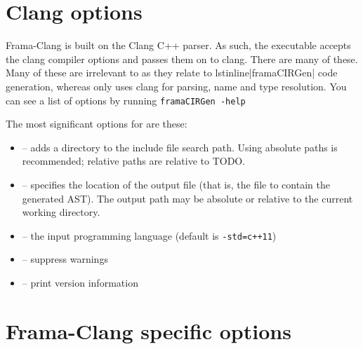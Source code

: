 \section{Clang options}

Frama-Clang is built on the Clang C++ parser. 
As such, the \irg executable accepts the clang
compiler options and passes them on to clang. There are many of these.
Many of these are irrelevant to \fcl as they relate to lstinline|framaCIRGen|
code generation, whereas \fcl only uses clang for parsing, name
and type resolution.
You can see a list of options by running 
\lstinline|framaCIRGen -help|

The most significant options for  \irg are these:
\begin{itemize}
	\item {} -- adds a directory to the include file search path. Using absolute paths is recommended; relative paths are relative to TODO.
	\item {} -- specifies the location of the output file (that is, the file to contain the generated AST). The output path may be absolute or relative to the current working directory.
	\item {} -- the input programming language (default is \lstinline|-std=c++11|)
	\item {} -- suppress warnings
	\item {} -- print version information
\end{itemize}

\section{Frama-Clang specific options}

